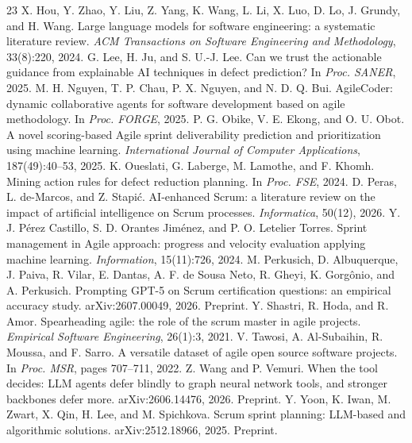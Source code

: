 \documentclass[pmlr]{jmlr}
\begin{document}
\begin{thebibliography}{23}
 X. Hou, Y. Zhao, Y. Liu, Z. Yang, K. Wang, L. Li, X. Luo, D. Lo, J. Grundy, and H. Wang. Large language models for software engineering: a systematic literature review. \emph{ACM Transactions on Software Engineering and Methodology}, 33(8):220, 2024.
 G. Lee, H. Ju, and S. U.-J. Lee. Can we trust the actionable guidance from explainable AI techniques in defect prediction? In \emph{Proc. SANER}, 2025.
 M. H. Nguyen, T. P. Chau, P. X. Nguyen, and N. D. Q. Bui. AgileCoder: dynamic collaborative agents for software development based on agile methodology. In \emph{Proc. FORGE}, 2025.
 P. G. Obike, V. E. Ekong, and O. U. Obot. A novel scoring-based Agile sprint deliverability prediction and prioritization using machine learning. \emph{International Journal of Computer Applications}, 187(49):40--53, 2025.
 K. Oueslati, G. Laberge, M. Lamothe, and F. Khomh. Mining action rules for defect reduction planning. In \emph{Proc. FSE}, 2024.
 D. Peras, L. de-Marcos, and Z. Stapi\'c. AI-enhanced Scrum: a literature review on the impact of artificial intelligence on Scrum processes. \emph{Informatica}, 50(12), 2026.
 Y. J. P\'erez Castillo, S. D. Orantes Jim\'enez, and P. O. Letelier Torres. Sprint management in Agile approach: progress and velocity evaluation applying machine learning. \emph{Information}, 15(11):726, 2024.
 M. Perkusich, D. Albuquerque, J. Paiva, R. Vilar, E. Dantas, A. F. de Sousa Neto, R. Gheyi, K. Gorg\^onio, and A. Perkusich. Prompting GPT-5 on Scrum certification questions: an empirical accuracy study. arXiv:2607.00049, 2026. Preprint.
 Y. Shastri, R. Hoda, and R. Amor. Spearheading agile: the role of the scrum master in agile projects. \emph{Empirical Software Engineering}, 26(1):3, 2021.
 V. Tawosi, A. Al-Subaihin, R. Moussa, and F. Sarro. A versatile dataset of agile open source software projects. In \emph{Proc. MSR}, pages 707--711, 2022.
 Z. Wang and P. Vemuri. When the tool decides: LLM agents defer blindly to graph neural network tools, and stronger backbones defer more. arXiv:2606.14476, 2026. Preprint.
 Y. Yoon, K. Iwan, M. Zwart, X. Qin, H. Lee, and M. Spichkova. Scrum sprint planning: LLM-based and algorithmic solutions. arXiv:2512.18966, 2025. Preprint.
\end{thebibliography}
\end{document}
